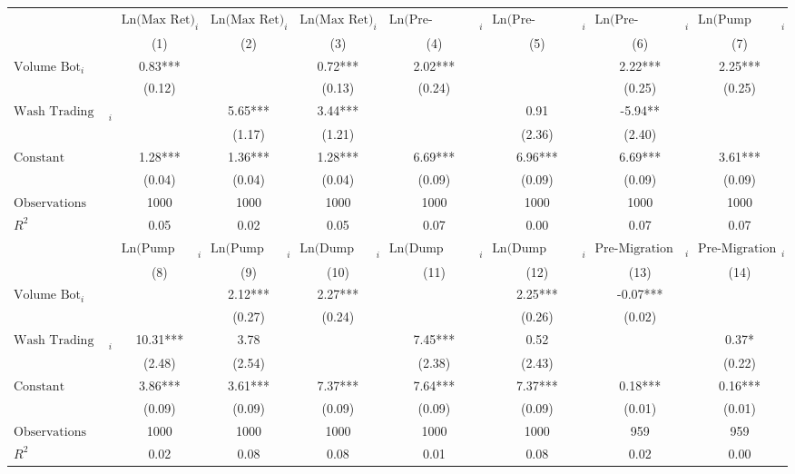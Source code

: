 \begin{tabular}{lccccccc}
\hline
 & $\text{Ln(Max Ret)}_{i}$ & $\text{Ln(Max Ret)}_{i}$ & $\text{Ln(Max Ret)}_{i}$ & $\text{Ln(Pre-Migration Duration)}_{i}$ & $\text{Ln(Pre-Migration Duration)}_{i}$ & $\text{Ln(Pre-Migration Duration)}_{i}$ & $\text{Ln(Pump Duration)}_{i}$ \\
 & (1) & (2) & (3) & (4) & (5) & (6) & (7) \\
\hline
$\text{Volume Bot}_{i}$ & 0.83*** &  & 0.72*** & 2.02*** &  & 2.22*** & 2.25*** \\
 & (0.12) &  & (0.13) & (0.24) &  & (0.25) & (0.25) \\
$\text{Wash Trading Volume \%}_{i}$ &  & 5.65*** & 3.44*** &  & 0.91 & -5.94** &  \\
 &  & (1.17) & (1.21) &  & (2.36) & (2.40) &  \\
$\text{Constant}$ & 1.28*** & 1.36*** & 1.28*** & 6.69*** & 6.96*** & 6.69*** & 3.61*** \\
 & (0.04) & (0.04) & (0.04) & (0.09) & (0.09) & (0.09) & (0.09) \\
$\text{Observations}$ & 1000 & 1000 & 1000 & 1000 & 1000 & 1000 & 1000 \\
$R^2$ & 0.05 & 0.02 & 0.05 & 0.07 & 0.00 & 0.07 & 0.07 \\
\hline
\hline
 & $\text{Ln(Pump Duration)}_{i}$ & $\text{Ln(Pump Duration)}_{i}$ & $\text{Ln(Dump Duration)}_{i}$ & $\text{Ln(Dump Duration)}_{i}$ & $\text{Ln(Dump Duration)}_{i}$ & $\text{Pre-Migration Volatility}_{i}$ & $\text{Pre-Migration Volatility}_{i}$ \\
 & (8) & (9) & (10) & (11) & (12) & (13) & (14) \\
\hline
$\text{Volume Bot}_{i}$ &  & 2.12*** & 2.27*** &  & 2.25*** & -0.07*** &  \\
 &  & (0.27) & (0.24) &  & (0.26) & (0.02) &  \\
$\text{Wash Trading Volume \%}_{i}$ & 10.31*** & 3.78 &  & 7.45*** & 0.52 &  & 0.37* \\
 & (2.48) & (2.54) &  & (2.38) & (2.43) &  & (0.22) \\
$\text{Constant}$ & 3.86*** & 3.61*** & 7.37*** & 7.64*** & 7.37*** & 0.18*** & 0.16*** \\
 & (0.09) & (0.09) & (0.09) & (0.09) & (0.09) & (0.01) & (0.01) \\
$\text{Observations}$ & 1000 & 1000 & 1000 & 1000 & 1000 & 959 & 959 \\
$R^2$ & 0.02 & 0.08 & 0.08 & 0.01 & 0.08 & 0.02 & 0.00 \\

\end{tabular}
